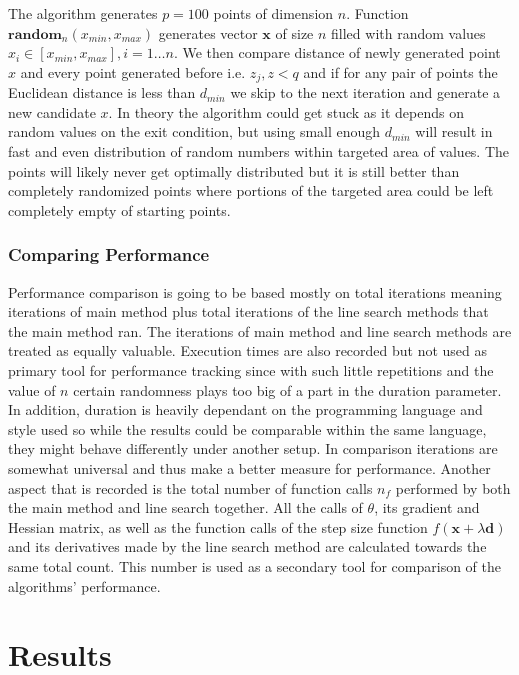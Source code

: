 \documentclass[a4paper,english,titlepage,12pt]{article}
\newcommand{\vect}[1]{\ensuremath{\mathbf{#1}}}
\begin{document}
The algorithm generates $p = 100$ points of dimension $n$. Function $\mathbf{random}_n(x_{min}, x_{max})$ generates vector $\vect{x}$ of size $n$ filled with random values $x_i \in [x_{min}, x_{max}], i = 1 \dots n$. We then compare distance of newly generated point $x$ and every point generated before i.e. $z_j, z < q$ and if for any pair of points the Euclidean distance is less than $d_{min}$ we skip to the next iteration and generate a new candidate $x$. In theory the algorithm could get stuck as it depends on random values on the exit condition, but using small enough $d_{min}$ will result in fast and even distribution of random numbers within targeted area of values. The points will likely never get optimally distributed but it is still better than completely randomized points where portions of the targeted area could be left completely empty of starting points.


\subsubsection{Comparing Performance}

Performance comparison is going to be based mostly on total iterations meaning iterations of main method plus total iterations of the line search methods that the main method ran. The iterations of main method and line search methods are treated as equally valuable. Execution times are also recorded but not used as primary tool for performance tracking since with such little repetitions and the value of $n$ certain randomness plays too big of a part in the duration parameter. In addition, duration is heavily dependant on the programming language and style used so while the results could be comparable within the same language, they might behave differently under another setup. In comparison iterations are somewhat universal and thus make a better measure for performance. Another aspect that is recorded is the total number of function calls $n_f$ performed by both the main method and line search together. All the calls of $\theta$, its gradient and Hessian matrix, as well as the function calls of the step size function $f(\vect{x} + \lambda \vect{d})$ and its derivatives made by the line search method are calculated towards the same total count. This number is used as a secondary tool for comparison of the algorithms' performance.


\section{Results}
\end{document}

